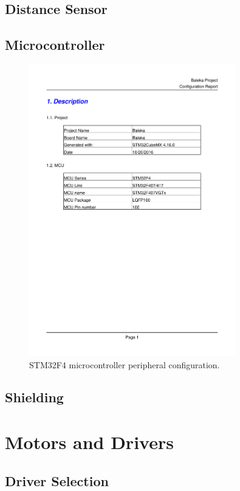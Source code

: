 \subsection{Distance Sensor}
\subsection{Microcontroller}

\begin{figure}
\centering
\includegraphics[clip, trim=1cm 7cm 1cm 7cm, page = 2, width=0.8\textwidth]{pdfs/BalekaSTMConfig.pdf} 
\caption{STM32F4 microcontroller peripheral configuration.}
\label{fig:drylin-linear-guide}
\end{figure}

\subsection{Shielding}
\section{Motors and Drivers}

\subsection{Driver Selection}

